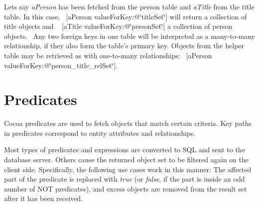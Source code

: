 Lets say {\itshape a\+Person} has been fetched from the person table and {\itshape a\+Title} from the title table. In this case,~\newline
 {\ttfamily \mbox{[}a\+Person value\+For\+Key\+:@\char`\"{}title\+Set\char`\"{}\mbox{]}} will return a collection of title objects and ~\newline
 {\ttfamily \mbox{[}a\+Title value\+For\+Key\+:@\char`\"{}person\+Set\char`\"{}\mbox{]}} a collection of person objects.~\newline
 Any two foreign keys in one table will be interpreted as a many-\/to-\/many relationship, if they also form the table's primary key. Objects from the helper table may be retrieved as with one-\/to-\/many relationships\+:~\newline
 {\ttfamily \mbox{[}a\+Person value\+For\+Key\+:@\char`\"{}person\+\_\+title\+\_\+rel\+Set\char`\"{}\mbox{]}}. \hypertarget{predicates}{}\section{Predicates}\label{predicates}
Cocoa predicates are used to fetch objects that match certain criteria. Key paths in predicates correspond to entity attributes and relationships.

Most types of predicates and expressions are converted to S\+Q\+L and sent to the database server. Others cause the returned object set to be filtered again on the client side. Specifically, the following use cases work in this manner\+: The affected part of the predicate is replaced with {\itshape true} (or {\itshape false}, if the part is inside an odd number of N\+O\+T predicates), and excess objects are removed from the result set after it has been received.


